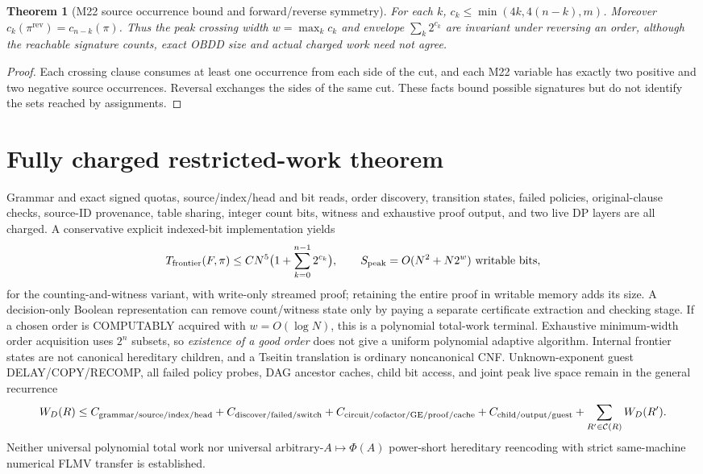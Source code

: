 \documentclass[11pt]{article}
\newtheorem{theorem}{Theorem}
\begin{document}
\begin{theorem}[M22 source occurrence bound and forward/reverse symmetry]
For each $k$, $c_k\le\min(4k,4(n-k),m)$. Moreover $c_k(\pi^{\mathrm{rev}})=c_{n-k}(\pi)$. Thus the peak crossing width $w=\max_k c_k$ and envelope $\sum_k 2^{c_k}$ are invariant under reversing an order, although the reachable signature counts, exact OBDD size and actual charged work need not agree.
\end{theorem}
\begin{proof}
Each crossing clause consumes at least one occurrence from each side of the cut, and each M22 variable has exactly two positive and two negative source occurrences. Reversal exchanges the sides of the same cut. These facts bound possible signatures but do not identify the sets reached by assignments.
\end{proof}

\section{Fully charged restricted-work theorem}
\noindent Grammar and exact signed quotas, source/index/head and bit reads, order discovery, transition states, failed policies, original-clause checks, source-ID provenance, table sharing, integer count bits, witness and exhaustive proof output, and two live DP layers are all charged. A conservative explicit indexed-bit implementation yields
\[
T_{\mathrm{frontier}}(F,\pi)\le C N^5\bigl(1+\sum_{k=0}^{n-1}2^{c_k}\bigr),\qquad
S_{\mathrm{peak}}=O(N^2+N2^w)\ {\rm writable\ bits},
\]
for the counting-and-witness variant, with write-only streamed proof; retaining the entire proof in writable memory adds its size. A decision-only Boolean representation can remove count/witness state only by paying a separate certificate extraction and checking stage. If a chosen order is COMPUTABLY acquired with $w=O(\log N)$, this is a polynomial total-work terminal. Exhaustive minimum-width order acquisition uses $2^n$ subsets, so \emph{existence of a good order} does not give a uniform polynomial adaptive algorithm. Internal frontier states are not canonical hereditary children, and a Tseitin translation is ordinary noncanonical CNF. Unknown-exponent guest DELAY/COPY/RECOMP, all failed policy probes, DAG ancestor caches, child bit access, and joint peak live space remain in the general recurrence
\[
W_D(R)\le C_{\rm grammar/source/index/head}+C_{\rm discover/failed/switch}
+C_{\rm circuit/cofactor/GE/proof/cache}+C_{\rm child/output/guest}
+\sum_{R'\in\mathcal C(R)}W_D(R').
\]
Neither universal polynomial total work nor universal arbitrary-$A\mapsto\Phi(A)$ power-short hereditary reencoding with strict same-machine numerical FLMV transfer is established.
\end{document}
